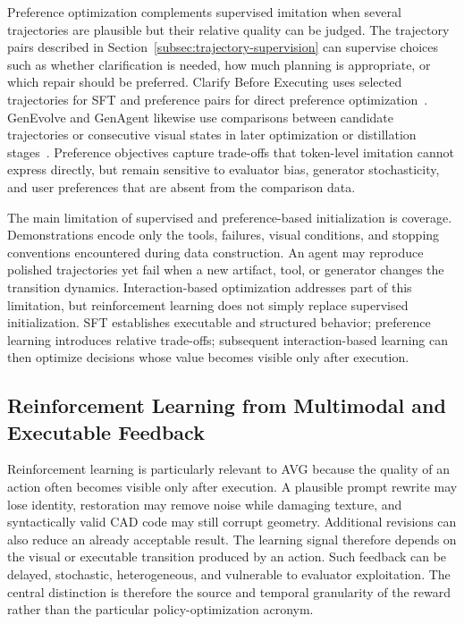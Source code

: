 Preference optimization complements supervised imitation when several trajectories are plausible but their relative quality can be judged. The trajectory pairs described in Section~\ref{subsec:trajectory-supervision} can supervise choices such as whether clarification is needed, how much planning is appropriate, or which repair should be preferred. Clarify Before Executing uses selected trajectories for SFT and preference pairs for direct preference optimization~\cite{avg260716352}. GenEvolve and GenAgent likewise use comparisons between candidate trajectories or consecutive visual states in later optimization or distillation stages~\cite{chen2026genevolve,jiang2026genagent}. Preference objectives capture trade-offs that token-level imitation cannot express directly, but remain sensitive to evaluator bias, generator stochasticity, and user preferences that are absent from the comparison data.

The main limitation of supervised and preference-based initialization is coverage. Demonstrations encode only the tools, failures, visual conditions, and stopping conventions encountered during data construction. An agent may reproduce polished trajectories yet fail when a new artifact, tool, or generator changes the transition dynamics. Interaction-based optimization addresses part of this limitation, but reinforcement learning does not simply replace supervised initialization. SFT establishes executable and structured behavior; preference learning introduces relative trade-offs; subsequent interaction-based learning can then optimize decisions whose value becomes visible only after execution.

\subsection{Reinforcement Learning from Multimodal and Executable Feedback}
\label{subsec:multimodal-rl}

Reinforcement learning is particularly relevant to AVG because the quality of an action often becomes visible only after execution. A plausible prompt rewrite may lose identity, restoration may remove noise while damaging texture, and syntactically valid CAD code may still corrupt geometry. Additional revisions can also reduce an already acceptable result. The learning signal therefore depends on the visual or executable transition produced by an action. Such feedback can be delayed, stochastic, heterogeneous, and vulnerable to evaluator exploitation. The central distinction is therefore the source and temporal granularity of the reward rather than the particular policy-optimization acronym.

